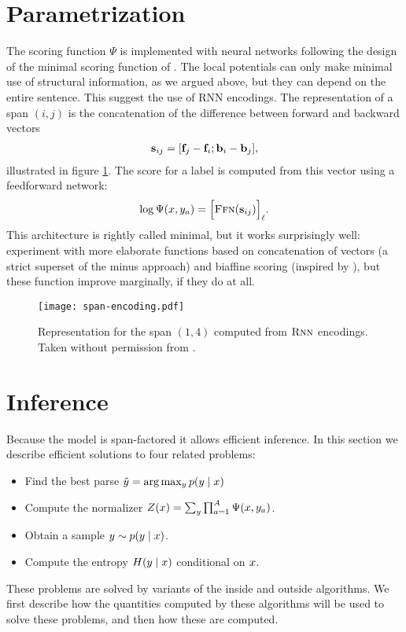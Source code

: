 \section{Parametrization}
The scoring function $\Psi$ is implemented with neural networks following the design of the minimal scoring function of \citet{stern2017minimal}. The local potentials can only make minimal use of structural information, as we argued above, but they can depend on the entire sentence. This suggest the use of RNN encodings. The representation of a span $(i, j)$ is the concatenation of the difference between forward and backward vectors
\begin{align}
  \label{eq:potential-function}
  \mathbf{s}_{ij} = [\mathbf{f}_j - \mathbf{f}_i; \mathbf{b}_i - \mathbf{b}_j],
\end{align}
illustrated in figure \ref{fig:span-feature}. The score for a label is computed from this vector using a feedforward network:
\begin{align}
  \log \Psi(x, y_a) = \Big[ \textsc{Ffn}( \mathbf{s}_{ij} ) \Big]_{\ell}.
\end{align}
This architecture is rightly called minimal, but it works surprisingly well: \citet{stern2017minimal} experiment with more elaborate functions based on concatenation of vectors (a strict superset of the minus approach) and biaffine scoring (inspired by \citep{dozat2016deep}), but these function improve marginally, if they do at all.

\begin{figure}
  \texttt{[image: span-encoding.pdf]}
  \caption{Representation for the span $(1, 4)$ computed from $\textsc{Rnn}$ encodings. Taken without permission from \citet{stern2018analyis}.}
  \label{fig:span-feature}
\end{figure}

\section{Inference}
Because the model is span-factored it allows efficient inference. In this section we describe efficient solutions to four related problems:
\begin{itemize}
  \item Find the best parse $\hat{ y } = \arg \max_{y } p(y  \mid x)$
  \item Compute the normalizer $Z(x) = \sum_{ y  } \prod_{ a=1 }^{ A } \Psi( x, y_a )$.
  \item Obtain a sample $y \sim p(y  \mid x)$.
  \item Compute the entropy $H(y \mid x)$ conditional on $x$.
\end{itemize}
These problems are solved by variants of the inside and outside algorithms. We first describe how the quantities computed by these algorithms will be used to solve these problems, and then how these are computed.

